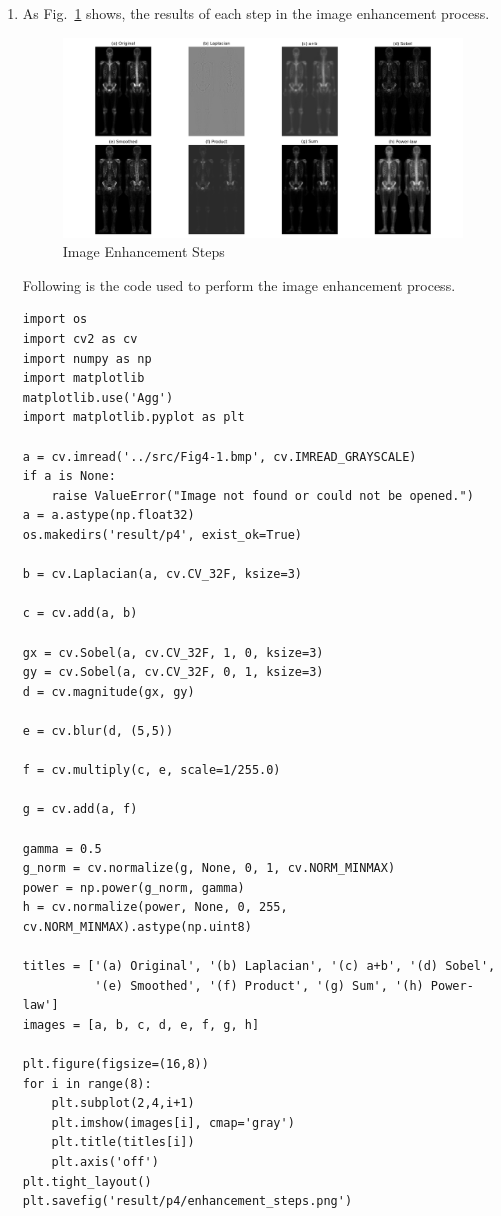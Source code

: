 \documentclass[12pt,a4paper]{article}
\begin{document}
\begin{enumerate}
\begin{verbatim}
plt.subplot(1,2,2)
plt.title('Roberts Cross Gradient')
plt.imshow(grad, cmap='gray')
plt.axis('off')
plt.tight_layout()
plt.savefig('result/p3/roberts_cross_gradient.png')
    \end{verbatim}
    \item As Fig.~\ref{fig:enhancement_steps} shows, the results of each step in the image enhancement process.
    \begin{figure}[H]
        \centering
        \includegraphics[width=1.0\textwidth]{code/result/p4/enhancement_steps.png}
        \caption{Image Enhancement Steps}
        \label{fig:enhancement_steps}
    \end{figure}
    Following is the code used to perform the image enhancement process.
    \begin{verbatim}
import os
import cv2 as cv
import numpy as np
import matplotlib
matplotlib.use('Agg')
import matplotlib.pyplot as plt

a = cv.imread('../src/Fig4-1.bmp', cv.IMREAD_GRAYSCALE)
if a is None:
    raise ValueError("Image not found or could not be opened.")
a = a.astype(np.float32)
os.makedirs('result/p4', exist_ok=True)

b = cv.Laplacian(a, cv.CV_32F, ksize=3)

c = cv.add(a, b)

gx = cv.Sobel(a, cv.CV_32F, 1, 0, ksize=3)
gy = cv.Sobel(a, cv.CV_32F, 0, 1, ksize=3)
d = cv.magnitude(gx, gy)

e = cv.blur(d, (5,5))

f = cv.multiply(c, e, scale=1/255.0)

g = cv.add(a, f)

gamma = 0.5
g_norm = cv.normalize(g, None, 0, 1, cv.NORM_MINMAX)
power = np.power(g_norm, gamma)
h = cv.normalize(power, None, 0, 255, cv.NORM_MINMAX).astype(np.uint8)

titles = ['(a) Original', '(b) Laplacian', '(c) a+b', '(d) Sobel',
          '(e) Smoothed', '(f) Product', '(g) Sum', '(h) Power-law']
images = [a, b, c, d, e, f, g, h]

plt.figure(figsize=(16,8))
for i in range(8):
    plt.subplot(2,4,i+1)
    plt.imshow(images[i], cmap='gray')
    plt.title(titles[i])
    plt.axis('off')
plt.tight_layout()
plt.savefig('result/p4/enhancement_steps.png')
    \end{verbatim}
\end{enumerate}
\end{document}
